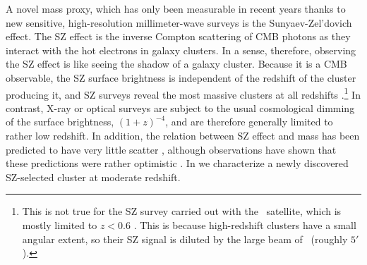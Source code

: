 A novel mass proxy, which has only been measurable in recent years thanks to new sensitive, high-resolution millimeter-wave surveys is the Sunyaev-Zel'dovich \citep[SZ,][]{sunyaev72} effect. The SZ effect is the inverse Compton scattering of CMB photons as they interact with the hot electrons in galaxy clusters. In a sense, therefore, observing the SZ effect is like seeing the shadow of a galaxy cluster. Because it is a CMB observable, the SZ surface brightness is independent of the redshift of the cluster producing it, and SZ surveys reveal the most massive clusters at all redshifts \citep{hasselfield13,bleem15}.\footnote{This is not true for the SZ survey carried out with the \planck\ satellite, which is mostly limited to $z<0.6$ \citep{planck15xxvii}. This is because high-redshift clusters have a small angular extent, so their SZ signal is diluted by the large beam of \planck\ (roughly $5'$).} In contrast, X-ray or optical surveys are subject to the usual cosmological dimming of the surface brightness, $(1+z)^{-4}$, and are therefore generally limited to rather low redshift. In addition, the relation between SZ effect and mass has been predicted to have very little scatter \citep[at a level of 5--10\%; e.g.,][]{motl05,battaglia12}, although observations have shown that these predictions were rather optimistic \citep{benson13,sifon13}. In  we characterize a newly discovered SZ-selected cluster at moderate redshift.

